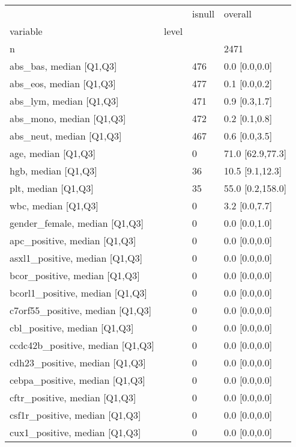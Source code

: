 \begin{tabular}{llll}
\toprule
                 &    & isnull &           overall \\
variable & level &        &                   \\
\midrule
n &    &        &              2471 \\
abs\_bas, median [Q1,Q3] &    &    476 &     0.0 [0.0,0.0] \\
abs\_eos, median [Q1,Q3] &    &    477 &     0.1 [0.0,0.2] \\
abs\_lym, median [Q1,Q3] &    &    471 &     0.9 [0.3,1.7] \\
abs\_mono, median [Q1,Q3] &    &    472 &     0.2 [0.1,0.8] \\
abs\_neut, median [Q1,Q3] &    &    467 &     0.6 [0.0,3.5] \\
age, median [Q1,Q3] &    &      0 &  71.0 [62.9,77.3] \\
hgb, median [Q1,Q3] &    &     36 &   10.5 [9.1,12.3] \\
plt, median [Q1,Q3] &    &     35 &  55.0 [0.2,158.0] \\
wbc, median [Q1,Q3] &    &      0 &     3.2 [0.0,7.7] \\
gender\_female, median [Q1,Q3] &    &      0 &     0.0 [0.0,1.0] \\
apc\_positive, median [Q1,Q3] &    &      0 &     0.0 [0.0,0.0] \\
asxl1\_positive, median [Q1,Q3] &    &      0 &     0.0 [0.0,0.0] \\
bcor\_positive, median [Q1,Q3] &    &      0 &     0.0 [0.0,0.0] \\
bcorl1\_positive, median [Q1,Q3] &    &      0 &     0.0 [0.0,0.0] \\
c7orf55\_positive, median [Q1,Q3] &    &      0 &     0.0 [0.0,0.0] \\
cbl\_positive, median [Q1,Q3] &    &      0 &     0.0 [0.0,0.0] \\
ccdc42b\_positive, median [Q1,Q3] &    &      0 &     0.0 [0.0,0.0] \\
cdh23\_positive, median [Q1,Q3] &    &      0 &     0.0 [0.0,0.0] \\
cebpa\_positive, median [Q1,Q3] &    &      0 &     0.0 [0.0,0.0] \\
cftr\_positive, median [Q1,Q3] &    &      0 &     0.0 [0.0,0.0] \\
csf1r\_positive, median [Q1,Q3] &    &      0 &     0.0 [0.0,0.0] \\
cux1\_positive, median [Q1,Q3] &    &      0 &     0.0 [0.0,0.0] \\

\end{tabular}
